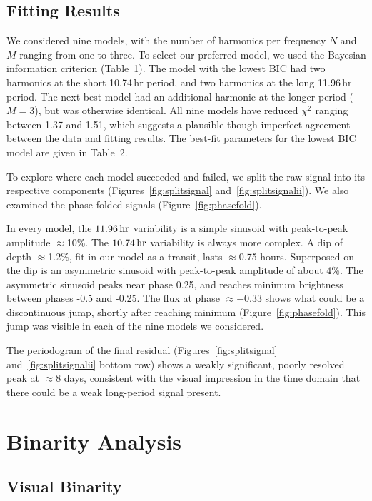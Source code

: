 \documentclass[12pt,twocolumn,tighten]{aastex62}
\begin{document}
\subsection{Fitting Results}

We considered nine models, with the number of harmonics per frequency
$N$ and $M$ ranging from one to three.  To select our preferred model,
we used the Bayesian information criterion (Table~1).  The model with
the lowest BIC had two harmonics at the short 10.74$\,$hr period, and
two harmonics at the long 11.96$\,$hr period.  The next-best model had
an additional harmonic at the longer period ($M=3$), but was otherwise
identical.  All nine models have reduced $\chi^2$ ranging between 1.37
and 1.51, which suggests a plausible though imperfect agreement
between the data and fitting results.  The best-fit parameters for the
lowest BIC model are given in Table~2.

To explore where each model succeeded and failed, we split the raw
signal into its respective components (Figures~\ref{fig:splitsignal}
and~\ref{fig:splitsignalii}).  We also examined the phase-folded
signals (Figure~\ref{fig:phasefold}).  

In every model, the $11.96\,{\rm hr}$ variability is a simple sinusoid
with peak-to-peak amplitude $\approx$10\%.  The $10.74\,{\rm hr}$
variability is always more complex.  A dip of depth $\approx$1.2\%,
fit in our model as a transit, lasts $\approx$0.75 hours.  Superposed
on the dip is an asymmetric sinusoid with peak-to-peak
amplitude of about 4\%. The asymmetric sinusoid peaks near phase 0.25,
and reaches minimum brightness between phases -0.5 and -0.25.  The
flux at phase $\approx -0.33$ shows what could be a discontinuous
jump, shortly after reaching minimum (Figure~\ref{fig:phasefold}).
This jump was visible in each of the nine models we considered.

The periodogram of the final residual (Figures~\ref{fig:splitsignal} and~\ref{fig:splitsignalii}
bottom row) shows a weakly significant, poorly resolved peak at
$\approx$8 days, consistent with the visual impression in the time
domain that there could be a weak long-period signal present.



\section{Binarity Analysis}
\label{sec:gaia}

\subsection{Visual Binarity}
\label{subsec:blend}
\end{document}
